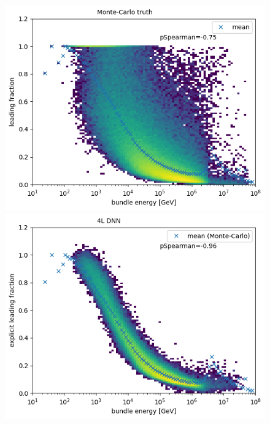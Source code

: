 \documentclass[
  tucolor,       %
  BCOR=12mm,     %
  parskip=half,  %
  open=any,      %
  cleardoublepage=plain,  %
]{tudothesis}
\begin{document}
\begin{figure}
  \centering
  \begin{minipage}[t]{0.32\textwidth}
    \includegraphics[width=\textwidth]{Plots/energy leading fraction correaltion monte carlo}
  \end{minipage}
  \begin{minipage}[t]{0.32\textwidth}
    \includegraphics[width=\textwidth]{Plots/energy leading fraction correaltion small dnn explicit}
  \end{minipage}
  \begin{minipage}[t]{0.32\textwidth}

\end{minipage}
\end{figure}
\end{document}
